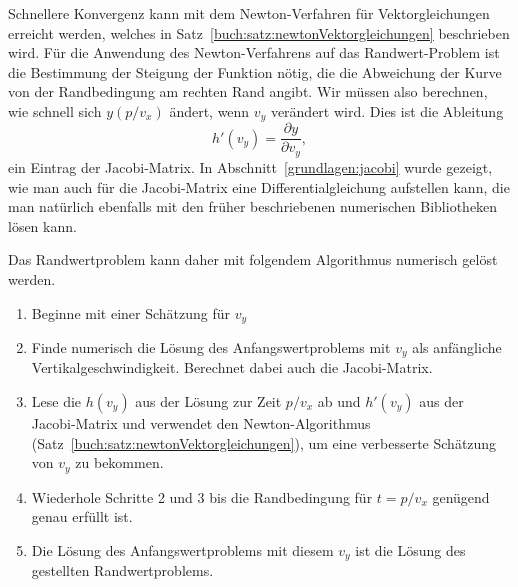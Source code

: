 Schnellere Konvergenz kann mit dem Newton-Verfahren für Vektorgleichungen
erreicht werden,
welches in Satz~\ref{buch:satz:newtonVektorgleichungen}
beschrieben wird.
%
Für die Anwendung des Newton-Verfahrens auf das Randwert-Problem
ist die Bestimmung der Steigung der Funktion nötig, die die Abweichung
der Kurve von der Randbedingung am rechten Rand angibt.
Wir müssen also berechnen, wie schnell sich $y(p/v_x)$ ändert,
wenn $v_y$ verändert wird.
Dies ist die Ableitung
\[
h'(v_y)= \frac{\partial y}{\partial v_y},
\]
ein Eintrag der Jacobi-Matrix.
In Abschnitt~\ref{grundlagen:jacobi} wurde gezeigt, wie man auch für
die Jacobi-Matrix eine Differentialgleichung aufstellen kann, die
%
man natürlich ebenfalls mit den früher beschriebenen numerischen
Bibliotheken lösen kann.
%

Das Randwertproblem kann daher mit folgendem Algorithmus numerisch gelöst
werden.
\begin{enumerate}
\item Beginne mit einer Schätzung für $v_y$
\item Finde numerisch die Lösung des Anfangswertproblems mit $v_y$
als anfängliche Vertikalgeschwindigkeit.
Berechnet dabei auch die Jacobi-Matrix.
\item Lese die $h(v_y)$ aus der Lösung zur Zeit $p/v_x$ ab und $h'(v_y)$
aus der Jacobi-Matrix und verwendet den Newton-Algorithmus
(Satz~\ref{buch:satz:newtonVektorgleichungen}), um eine verbesserte
Schätzung von $v_y$ zu bekommen.
\item Wiederhole Schritte 2 und 3 bis die Randbedingung für $t=p/v_x$
genügend genau erfüllt ist.
\item Die Lösung des Anfangswertproblems mit diesem $v_y$ ist die
Lösung des gestellten Randwertproblems.
\end{enumerate}

